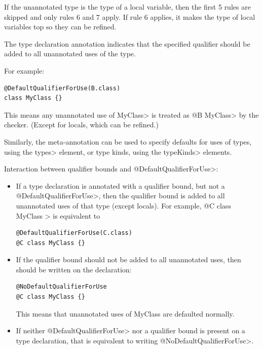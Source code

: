 If the unannotated type is the type of a local variable, then the first 5 rules are skipped and only
rules 6 and 7 apply. If rule 6 applies, it makes the type of local variables top so they can be refined.


The type declaration annotation 
indicates that the specified qualifier should be added to all unannotated uses of the type.

For example:
\begin{Verbatim}
@DefaultQualifierForUse(B.class)
class MyClass {}
\end{Verbatim}

This means any unannotated use of \<MyClass> is treated as \<@B MyClass> by the checker.
(Except for locals, which can be refined.)

Similarly, the meta-annotation  can be used to specify defaults
for uses of types, using the \<types> element, or type kinds, using the \<typeKinds> elements.

Interaction between qualifier bounds and \<@DefaultQualifierForUse>:
\begin{itemize}
\item
  If a type declaration is annotated with a qualifier bound, but not a \<@DefaultQualifierForUse>,
  then the qualifier bound is added to all unannotated uses of that type (except locals).
  For example, \<@C class MyClass {}> is equivalent to
\begin{Verbatim}
@DefaultQualifierForUse(C.class)
@C class MyClass {}
\end{Verbatim}

\item
  If the qualifier bound should not be added to all unannotated uses, then
   should be written on the declaration:
\begin{Verbatim}
@NoDefaultQualifierForUse
@C class MyClass {}
\end{Verbatim}
  This means that unannotated uses of MyClass are defaulted normally.
\item
  If neither \<@DefaultQualifierForUse> nor a qualifier bound is present on a type declaration, that
  is equivalent to writing \<@NoDefaultQualifierForUse>.

\end{itemize}

